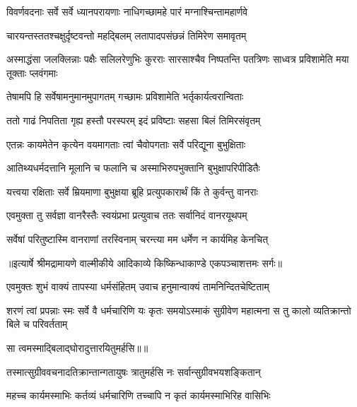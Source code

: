 \twolineshloka
{विवर्णवदनाः सर्वे सर्वे ध्यानपरायणाः}
{नाधिगच्छामहे पारं मग्नाश्चिन्तामहार्णवे} %

\twolineshloka
{चारयन्तस्ततश्चक्षुर्दृष्टवन्तो महद्बिलम्}
{लतापादपसंछन्नं तिमिरेण समावृतम्} %

\threelineshloka
{अस्माद्धंसा जलक्लिन्नाः पक्षैः सलिलरेणुभिः}
{कुरराः सारसाश्चैव निष्पतन्ति पतत्रिणः}
{साध्वत्र प्रविशामेति मया तूक्ताः प्लवंगमाः} %

\twolineshloka
{तेषामपि हि सर्वेषामनुमानमुपागतम्}
{गच्छामः प्रविशामेति भर्तृकार्यत्वरान्विताः} %

\twolineshloka
{ततो गाढं निपतिता गृह्य हस्तौ परस्परम्}
{इदं प्रविष्टाः सहसा बिलं तिमिरसंवृतम्} %

\twolineshloka
{एतन्नः कायमेतेन कृत्येन वयमागताः}
{त्वां चैवोपगताः सर्वे परिद्यूना बुभुक्षिताः} %

\twolineshloka
{आतिथ्यधर्मदत्तानि मूलानि च फलानि च}
{अस्माभिरुपभुक्तानि बुभुक्षापरिपीडितैः} %

\twolineshloka
{यत्त्वया रक्षिताः सर्वे म्रियमाणा बुभुक्षया}
{ब्रूहि प्रत्युपकारार्थं किं ते कुर्वन्तु वानराः} %

\twolineshloka
{एवमुक्ता तु सर्वज्ञा वानरैस्तैः स्वयंप्रभा}
{प्रत्युवाच ततः सर्वानिदं वानरयूथपम्} %

\twolineshloka
{सर्वेषां परितुष्टास्मि वानराणां तरस्विनाम्}
{चरन्त्या मम धर्मेण न कार्यमिह केनचित्} %


{॥इत्यार्षे श्रीमद्रामायणे वाल्मीकीये आदिकाव्ये किष्किन्धाकाण्डे एकपञ्चाशत्तमः सर्गः॥}


\twolineshloka
{एवमुक्तः शुभं वाक्यं तापस्या धर्मसंहितम्}
{उवाच हनुमान्वाक्यं तामनिन्दितचेष्टिताम्} %

\threelineshloka
{शरणं त्वां प्रपन्नाः स्मः सर्वे वै धर्मचारिणि}
{यः कृतः समयोऽस्माकं सुग्रीवेण महात्मना}
{स तु कालो व्यतिक्रान्तो बिले च परिवर्तताम्} %

{सा त्वमस्माद्बिलाद्घोरादुत्तारयितुमर्हसि॥॥} %

\addtocounter{shlokacount}{1}

\twolineshloka
{तस्मात्सुग्रीववचनादतिक्रान्तान्गतायुषः}
{त्रातुमर्हसि नः सर्वान्सुग्रीवभयशङ्कितान्} %

\twolineshloka
{महच्च कार्यमस्माभिः कर्तव्यं धर्मचारिणि}
{तच्चापि न कृतं कार्यमस्माभिरिह वासिभिः} %

